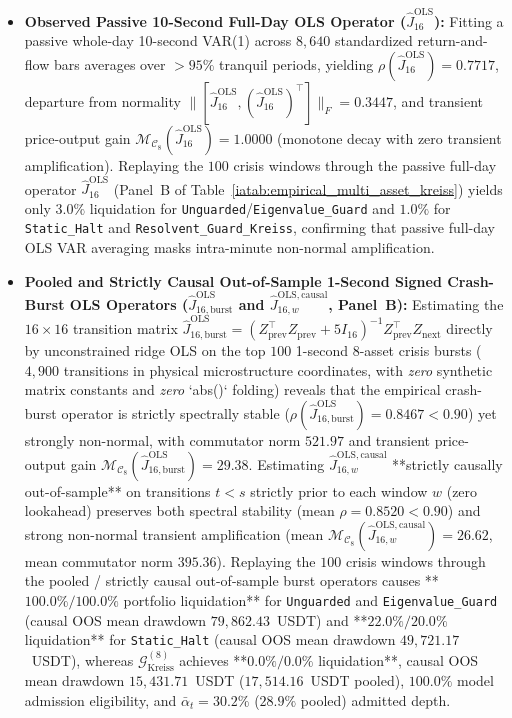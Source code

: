 \documentclass[12pt]{article}
\theoremstyle{definition}
\theoremstyle{remark}
\begin{document}
\begin{itemize}
\item \textbf{Observed Passive 10-Second Full-Day OLS Operator ($\hat{J}_{16}^{\mathrm{OLS}}$):} Fitting a passive whole-day 10-second VAR(1) across $8{,}640$ standardized return-and-flow bars averages over $>95\%$ tranquil periods, yielding $\rho(\hat{J}_{16}^{\mathrm{OLS}}) = 0.7717$, departure from normality $\|[\hat{J}_{16}^{\mathrm{OLS}}, (\hat{J}_{16}^{\mathrm{OLS}})^\top]\|_F = 0.3447$, and transient price-output gain $\mathcal{M}_{\mathcal{C}_8}(\hat{J}_{16}^{\mathrm{OLS}}) = 1.0000$ (monotone decay with zero transient amplification). Replaying the $100$ crisis windows through the passive full-day operator $\hat{J}_{16}^{\mathrm{OLS}}$ (Panel~B of Table~\ref{iatab:empirical_multi_asset_kreiss}) yields only $3.0\%$ liquidation for \texttt{Unguarded}/\texttt{Eigenvalue\_Guard} and $1.0\%$ for \texttt{Static\_Halt} and \texttt{Resolvent\_Guard\_Kreiss}, confirming that passive full-day OLS VAR averaging masks intra-minute non-normal amplification.
\item \textbf{Pooled and Strictly Causal Out-of-Sample 1-Second Signed Crash-Burst OLS Operators ($\hat{J}_{16,\mathrm{burst}}^{\mathrm{OLS}}$ and $\hat{J}_{16,w}^{\mathrm{OLS,causal}}$, Panel~B):} Estimating the $16\times 16$ transition matrix $\hat{J}_{16,\mathrm{burst}}^{\mathrm{OLS}} = (Z_{\mathrm{prev}}^\top Z_{\mathrm{prev}} + 5 I_{16})^{-1} Z_{\mathrm{prev}}^\top Z_{\mathrm{next}}$ directly by unconstrained ridge OLS on the top $100$ 1-second 8-asset crisis bursts ($4{,}900$ transitions in physical microstructure coordinates, with \emph{zero} synthetic matrix constants and \emph{zero} `abs()` folding) reveals that the empirical crash-burst operator is strictly spectrally stable ($\rho(\hat{J}_{16,\mathrm{burst}}^{\mathrm{OLS}}) = 0.8467 < 0.90$) yet strongly non-normal, with commutator norm $521.97$ and transient price-output gain $\mathcal{M}_{\mathcal{C}_8}(\hat{J}_{16,\mathrm{burst}}^{\mathrm{OLS}}) = 29.38$. Estimating $\hat{J}_{16,w}^{\mathrm{OLS,causal}}$ **strictly causally out-of-sample** on transitions $t < s$ strictly prior to each window $w$ (zero lookahead) preserves both spectral stability (mean $\rho = 0.8520 < 0.90$) and strong non-normal transient amplification (mean $\mathcal{M}_{\mathcal{C}_8}(\hat{J}_{16,w}^{\mathrm{OLS,causal}}) = 26.62$, mean commutator norm $395.36$). Replaying the $100$ crisis windows through the pooled / strictly causal out-of-sample burst operators causes **$100.0\% / 100.0\%$ portfolio liquidation** for \texttt{Unguarded} and \texttt{Eigenvalue\_Guard} (causal OOS mean drawdown $79{,}862.43$~USDT) and **$22.0\% / 20.0\%$ liquidation** for \texttt{Static\_Halt} (causal OOS mean drawdown $49{,}721.17$~USDT), whereas $\mathcal{G}_{\mathrm{Kreiss}}^{(8)}$ achieves **$0.0\% / 0.0\%$ liquidation**, causal OOS mean drawdown $15{,}431.71$~USDT ($17{,}514.16$~USDT pooled), $100.0\%$ model admission eligibility, and $\bar{\alpha}_t = 30.2\%$ ($28.9\%$ pooled) admitted depth.

\end{itemize}
\end{document}
